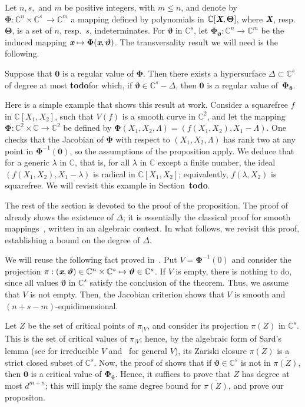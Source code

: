 \documentclass[sigconf]{acmart}
\def\td{{\bf todo}}
\def\Xb{\textit{\textbf{X}}}
\def\Thetab{\bm{\Theta}}
\def\thetab{\bm{\vartheta}}
\def\xb{\textit{\textbf{x}}}
\def\C{\mathbb{C}}
\def\dt{s}
\begin{document}
Let $n,\dt,$ and $m$ be positive integers, with $m \le n$, and denote
by $\bm\Phi :\C^n \times \C^{\dt} ~ \rightarrow \C^{m}$ a mapping
defined by polynomials in $\C[\Xb,\Thetab]$, where $\Xb$,
resp.\ $\Thetab$, is a set of $n$, resp.\ $\dt$, indeterminates.  For
$\thetab$ in $\C^{\dt}$, let $\bm\Phi_{\thetab} : \C^n \rightarrow
\C^{m}$ be the induced mapping $\xb\mapsto \bm\Phi(\xb,\thetab)$.  The
transversality result we will need is the following.

\begin{proposition} \label{prop:weak_t}
  Suppose that $\bm 0$ is a regular value of $\bm\Phi$. Then there
  exists a hypersurface $\Delta \subset \C^{\dt}$ of degree at most
  \td for which, if $\thetab \in \C^{\dt}-\Delta$, then $\bm 0$ is a
  regular value of~$\bm\Phi_{\thetab}$.
\end{proposition}

Here is a simple example that shows this result at work. Consider a
squarefree $f$ in $\C[X_1,X_2]$, such that $V(f)$ is a smooth curve in
$\C^2$, and let the mapping $\bm\Phi:\C^2\times \C \to \C^2$ be defined
by $\bm\Phi(X_1,X_2,\Lambda) = (f(X_1,X_2), X_1-\Lambda)$. One checks
that the Jacobian of $\bm\Phi$ with respect to $(X_1,X_2,\Lambda)$ has
rank two at any point in $\bm\Phi^{-1}(\bm 0)$, so the assumptions of the
proposition apply. We deduce that for a generic $\lambda$ in $\C$,
that is, for all $\lambda$ in $\C$ except a finite number, the ideal
$(f(X_1,X_2), X_1-\lambda)$ is radical in $\C[X_1,X_2]$; equivalently,
$f(\lambda, X_2)$ is squarefree. We will revisit this example in
Section~\td.

The rest of the section is devoted to the proof of the proposition.
The proof of \cite[Theorem B.3]{TWT} already shows the existence of
$\Delta$; it is essentially the classical proof for smooth
mappings~\cite[Section~3.7]{demazure2000bifurcations}, written in an
algebraic context. In what follows, we revisit this proof,
establishing a bound on the degree of $\Delta$.

We will reuse the following fact proved in~\cite{TWT}.  Put $V =
\bm\Phi^{-1}(0)$ and consider the projection $\pi:(\xb, \thetab) \in
\C^n \times \C^{\dt} \mapsto \thetab \in\C^{\dt}$.  If $V$ is empty,
there is nothing to do, since all values $\thetab$ in $\C^\dt$ satisfy
the conclusion of the theorem. Thus, we assume that $V$ is not
empty. Then, the Jacobian criterion shows that $V$ is
smooth and $(n+ \dt -m)$-equidimensional.

Let $Z$ be the set of critical points of $\pi_{|V}$, and consider its
projection $\pi(Z)$ in $\C^s$. This is the set of critical values of
$\pi_{|V}$; hence, by the algebraic form of Sard's lemma (see
\cite[Theorem~3.7]{Mumford76} for irreducible $V$
and~\cite[Proposition~B.2]{TWT} for general $V$), its Zariski closure
$\overline{\pi(Z)}$ is a strict closed subset of $\C^s$. Now, the
proof of \cite[Theorem B.3]{TWT} shows that if $\thetab \in \C^{\dt}$
is not in $\overline{\pi(Z)}$, then $\bm 0$ is a critical value of
$\bm\Phi_{\thetab}$. Hence, it suffices to prove that $Z$ has degree
at most $d^{m+n}$; this will imply the same degree bound for
$\overline{\pi(Z)}$, and prove our propositon.
\end{document}
